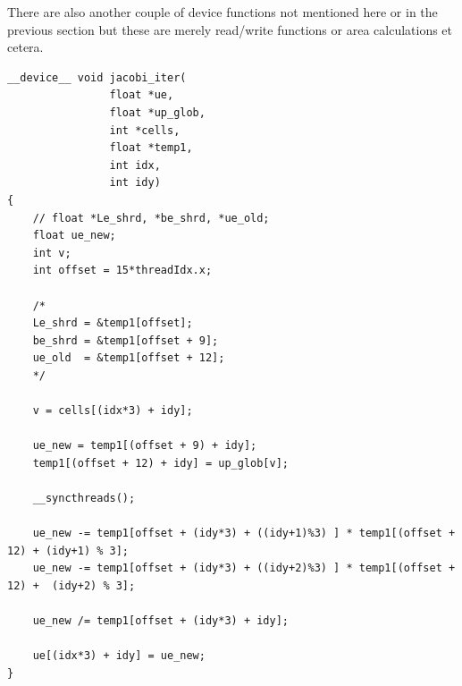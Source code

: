 There are also another couple of device functions not mentioned here or in the previous section but these are merely read/write functions or area calculations et cetera.

\begin{lstlisting}[style=cppStyle, caption={Device code for the Jacobi iteration.}, label={lst:jacobi}]
__device__ void jacobi_iter(
                float *ue,
                float *up_glob,
                int *cells,
                float *temp1,
                int idx,
                int idy)
{
    // float *Le_shrd, *be_shrd, *ue_old;
    float ue_new;
    int v;
    int offset = 15*threadIdx.x;

    /*
    Le_shrd = &temp1[offset];
    be_shrd = &temp1[offset + 9];
    ue_old  = &temp1[offset + 12];
    */

    v = cells[(idx*3) + idy];

    ue_new = temp1[(offset + 9) + idy];
    temp1[(offset + 12) + idy] = up_glob[v];

    __syncthreads();
    
    ue_new -= temp1[offset + (idy*3) + ((idy+1)%3) ] * temp1[(offset + 12) + (idy+1) % 3];
    ue_new -= temp1[offset + (idy*3) + ((idy+2)%3) ] * temp1[(offset + 12) +  (idy+2) % 3];

    ue_new /= temp1[offset + (idy*3) + idy];

    ue[(idx*3) + idy] = ue_new;
}
\end{lstlisting}